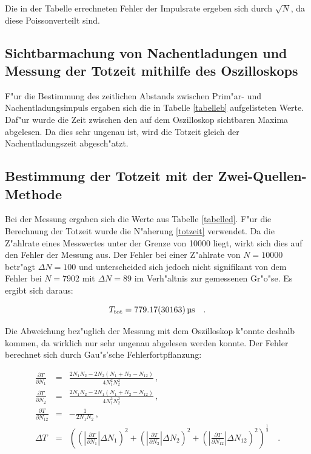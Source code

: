 	Die in der Tabelle errechneten Fehler der Impulsrate ergeben sich durch $\sqrt{N}$, da diese Poissonverteilt sind.

	\subsection{Sichtbarmachung von Nachentladungen und Messung der Totzeit mithilfe des Oszilloskops} %
	 \label{sub:sichtbarmachung_von_nachentladungen}

	
	
	F"ur die Bestimmung des zeitlichen Abstands zwischen Prim"ar- und Nachentladungsimpuls ergaben sich die in Tabelle \ref{tabelleb} aufgelisteten Werte. Daf"ur wurde die Zeit zwischen den auf dem Oszilloskop sichtbaren Maxima abgelesen.
	Da dies sehr ungenau ist, wird die Totzeit gleich der Nachentladungszeit abgesch"atzt.

	\subsection{Bestimmung der Totzeit mit der Zwei-Quellen-Methode} %
	\label{sub:bestimmung_der_totzeit_mit_der_zwei_quellen_methode}
	
	

	Bei der Messung ergaben sich die Werte aus Tabelle \ref{tabelled}.
	F"ur die Berechnung der Totzeit wurde die N"aherung \eqref{totzeit} verwendet. Da die Z"ahlrate eines Messwertes unter der Grenze von 10000 liegt, wirkt sich dies auf den Fehler der Messung aus.
	Der Fehler bei einer Z"ahlrate von $N = 10000$ betr"agt $\Delta N = 100$ und unterscheided sich jedoch nicht signifikant von dem Fehler bei $N = 7902$ mit $\Delta N = 89$ im Verh"altnis zur gemessenen Gr"o"se.
	Es ergibt sich daraus:

	\begin{equation*}
		T_\mathrm{tot} = \SI{779.17 (30163)}{\micro\second} \quad .
	\end{equation*}

	Die Abweichung bez"uglich der Messung mit dem Oszilloskop k"onnte deshalb kommen, da wirklich nur sehr ungenau abgelesen werden konnte.
	Der Fehler berechnet sich durch Gau"s'sche Fehlerfortpflanzung:

	\begin{eqnarray*}
		\frac{\partial T}{\partial N_\mathrm{1}} &=& \frac{2 N_\mathrm{1}N_\mathrm{2} - 2 N_\mathrm{2}(N_\mathrm{1} + N_\mathrm{2} - N_\mathrm{12})}{4N_\mathrm{1}^2N_\mathrm{2}^2} \, , \\
		\frac{\partial T}{\partial N_\mathrm{2}} &=& \frac{2 N_\mathrm{1}N_\mathrm{2} - 2 N_\mathrm{1}(N_\mathrm{1} + N_\mathrm{2} - N_\mathrm{12})}{4N_\mathrm{1}^2N_\mathrm{2}^2} \, ,\\
		\frac{\partial T}{\partial N_\mathrm{12}} &=& -\frac{1}{2 N_\mathrm{1} N_\mathrm{2}} \, ,\\
		\Delta T &=& \left( \left( |\frac{\partial T}{\partial N_\mathrm{1}}| \Delta N_\mathrm{1} \right)^2 + \left( |\frac{\partial T}{\partial N_\mathrm{2}}| \Delta N_\mathrm{2} \right)^2 + \left( |\frac{\partial T}{\partial N_\mathrm{12}}| \Delta N_\mathrm{12} \right)^2 \right)^\frac{1}{2} \quad .
	\end{eqnarray*}

